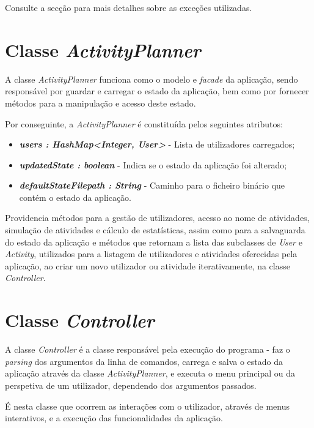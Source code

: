 \documentclass[a4paper,12pt]{scrreprt}
\begin{document}
    Consulte a secção \textit{} para mais detalhes sobre as exceções utilizadas.

\section{Classe \textit{ActivityPlanner}}
    A classe \textit{ActivityPlanner} funciona como o modelo e \textit{facade} da aplicação,
    sendo responsável por guardar e carregar o estado da aplicação,
    bem como por fornecer métodos para a manipulação e acesso deste estado.

    Por conseguinte, a \textit{ActivityPlanner} é constituída pelos seguintes atributos:

    \begin{itemize}
        \item \textit{\textbf{users : HashMap<Integer, User>}} - Lista de utilizadores carregados;
        \item \textit{\textbf{updatedState : boolean}} - Indica se o estado da aplicação foi alterado;
        \item \textit{\textbf{defaultStateFilepath : String}} - Caminho para o ficheiro binário que contém o estado da aplicação.
    \end{itemize}

    Providencia métodos para a gestão de utilizadores, acesso ao nome de atividades, simulação de atividades e cálculo de estatísticas,
    assim como para a salvaguarda do estado da aplicação e métodos que retornam a lista das subclasses de \textit{User} e \textit{Activity},
    utilizados para a listagem de utilizadores e atividades oferecidas pela aplicação, ao criar um novo utilizador ou atividade iterativamente,
    na classe \textit{Controller}.

\clearpage

\section{Classe \textit{Controller}}
    A classe \textit{Controller} é a classe responsável pela execução do programa -
    faz o \textit{parsing} dos argumentos da linha de comandos,
    carrega e salva o estado da aplicação através da classe \textit{ActivityPlanner},
    e executa o menu principal ou da perspetiva de um utilizador, dependendo dos argumentos passados.

    É nesta classe que ocorrem as interações com o utilizador, através de menus interativos,
    e a execução das funcionalidades da aplicação.
\end{document}
